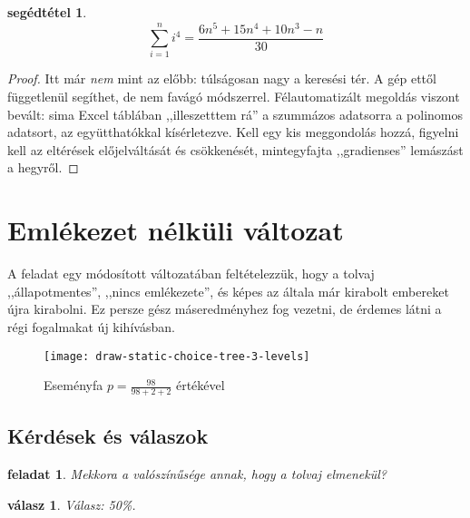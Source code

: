 \documentclass{article}
\newtheorem{task}{feladat}
\newtheorem{lemm}{segédtétel}
\newtheorem{answer}{válasz}
\begin{document}
	\begin{lemm}
		\[
			\sum_{i=1}^n i^4 = \frac{6n^5+15n^4+10n^3-n}{30}
		\]
	\end{lemm}
	\begin{proof}
		Itt már \emph{nem} mint az előbb: túlságosan nagy a keresési tér.
		A gép ettől függetlenül segíthet, de nem favágó módszerrel.
		Félautomatizált megoldás viszont bevált: sima Excel táblában ,,illeszetttem rá'' a szummázos adatsorra a polinomos adatsort, az együtthatókkal kísérletezve.
		Kell egy kis meggondolás hozzá, figyelni kell az eltérések előjelváltását és csökkenését, mintegyfajta ,,gradienses'' lemászást a hegyről.
	\end{proof}

	\section{Emlékezet nélküli változat}

	A feladat egy módosított változatában feltételezzük, hogy a tolvaj ,,állapotmentes'', ,,nincs emlékezete'', és képes az általa már kirabolt embereket újra kirabolni.
	Ez persze gész máseredményhez fog vezetni, de érdemes látni a régi fogalmakat új kihívásban.

	\begin{figure}[H]
		\caption*{Eseményfa $p = \frac{98}{98+2+2}$ értékével}
		\centering
		\texttt{[image: draw-static-choice-tree-3-levels]}
	\end{figure}

	\subsection{Kérdések és válaszok}

	\begin{task}
		Mekkora a valószínűsége annak, hogy a tolvaj elmenekül?
	\end{task}

	\begin{answer}
		Válasz: 50\%.
	\end{answer}
\end{document}
